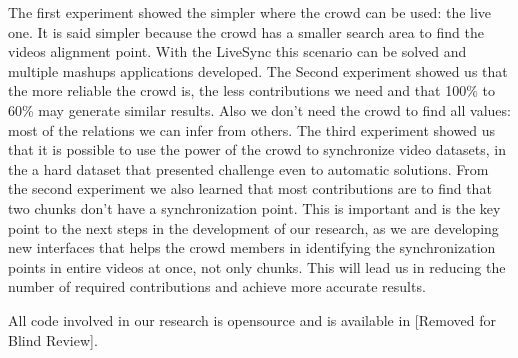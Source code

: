 The first experiment showed the simpler where the crowd can be used: the live one. It is said simpler because the crowd has a smaller search area to find the videos alignment point. With the LiveSync this scenario can be solved and multiple mashups applications developed. The Second experiment showed us that the more reliable the crowd is, the less contributions we need and that 100\% to 60\% may generate similar results. Also we don't need the crowd to find all values: most of the relations we can infer from others. The third experiment showed us that it is possible to use the power of the crowd to synchronize video datasets, in the a hard dataset that presented challenge even to automatic solutions. From the second experiment we also learned that most contributions are to find that two chunks don't have a synchronization point. This is important and is the key point to the next steps in the development of our research, as we are developing new interfaces that helps the crowd members in identifying the synchronization points in entire videos at once, not only chunks. This will lead us in reducing the number of required contributions and achieve more accurate results.

All code involved in our research is opensource and is available in [Removed for Blind Review].